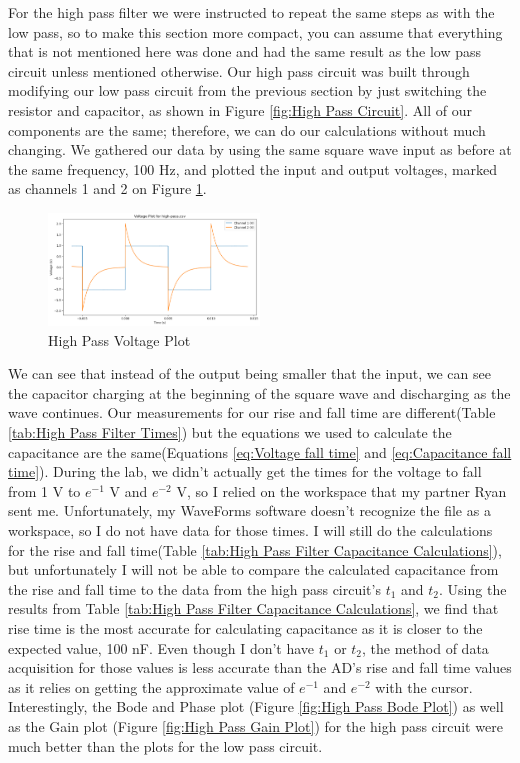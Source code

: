 \documentclass{article}
\begin{document}
For the high pass filter we were instructed to repeat the same steps as with the low pass, so to make this section more compact, you can assume that everything that is not mentioned here was done and had the same result as the low pass circuit unless mentioned otherwise. Our high pass circuit was built through modifying our low pass circuit from the previous section by just switching the resistor and capacitor, as shown in Figure \ref{fig:High Pass Circuit}. All of our components are the same; therefore, we can do our calculations without much changing. We gathered our data by using the same square wave input as before at the same frequency, 100 Hz, and plotted the input and output voltages, marked as channels 1 and 2 on Figure \ref{fig:High Pass Voltage Plot}.
\begin{figure}
    \centering
    \includegraphics[width=0.5\textwidth]{Images/high-pass-voltage.png}
    \caption{High Pass Voltage Plot}
    \label{fig:High Pass Voltage Plot}
\end{figure}

\noindent We can see that instead of the output being smaller that the input, we can see the capacitor charging at the beginning of the square wave and discharging as the wave continues. Our measurements for our rise and fall time are different(Table \ref{tab:High Pass Filter Times}) but the equations we used to calculate the capacitance are the same(Equations \ref{eq:Voltage fall time} and \ref{eq:Capacitance fall time}). During the lab, we didn't actually get the times for the voltage to fall from 1 V to $e^{-1}$ V and $e^{-2}$ V, so I relied on the workspace that my partner Ryan sent me. Unfortunately, my WaveForms software doesn't recognize the file as a workspace, so I do not have data for those times. I will still do the calculations for the rise and fall time(Table \ref{tab:High Pass Filter Capacitance Calculations}), but unfortunately I will not be able to compare the calculated capacitance from the rise and fall time to the data from the high pass circuit's $t_1$ and $t_2$. Using the results from Table \ref{tab:High Pass Filter Capacitance Calculations}, we find that rise time is the most accurate for calculating capacitance as it is closer to the expected value, 100 nF. Even though I don't have $t_1$ or $t_2$, the method of data acquisition for those values is less accurate than the AD's rise and fall time values as it relies on getting the approximate value of $e^{-1}$ and $e^{-2}$ with the cursor. Interestingly, the Bode and Phase plot (Figure \ref{fig:High Pass Bode Plot}) as well as the Gain plot (Figure \ref{fig:High Pass Gain Plot}) for the high pass circuit were much better than the plots for the low pass circuit. 
\end{document}
